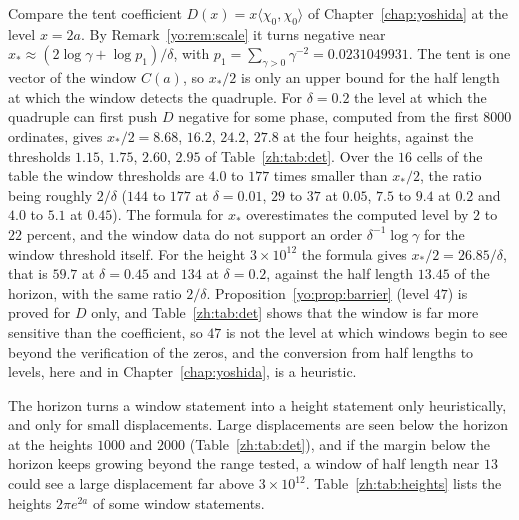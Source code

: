 Compare the tent coefficient $D(x)=x\langle\chi_0,\chi_0\rangle$ of Chapter~\ref{chap:yoshida} at the level $x=2a$. By Remark~\ref{yo:rem:scale} it turns negative near $x_*\approx(2\log\gamma+\log p_1)/\delta$, with $p_1=\sum_{\gamma>0}\gamma^{-2}=0.0231049931$. The tent is one vector of the window $C(a)$, so $x_*/2$ is only an upper bound for the half length at which the window detects the quadruple. For $\delta=0.2$ the level at which the quadruple can first push $D$ negative for some phase, computed from the first $8000$ ordinates, gives $x_*/2=8.68$, $16.2$, $24.2$, $27.8$ at the four heights, against the thresholds $1.15$, $1.75$, $2.60$, $2.95$ of Table~\ref{zh:tab:det}. Over the $16$ cells of the table the window thresholds are $4.0$ to $177$ times smaller than $x_*/2$, the ratio being roughly $2/\delta$ ($144$ to $177$ at $\delta=0.01$, $29$ to $37$ at $0.05$, $7.5$ to $9.4$ at $0.2$ and $4.0$ to $5.1$ at $0.45$). The formula for $x_*$ overestimates the computed level by $2$ to $22$ percent, and the window data do not support an order $\delta^{-1}\log\gamma$ for the window threshold itself. For the height $3\times10^{12}$ the formula gives $x_*/2=26.85/\delta$, that is $59.7$ at $\delta=0.45$ and $134$ at $\delta=0.2$, against the half length $13.45$ of the horizon, with the same ratio $2/\delta$. Proposition~\ref{yo:prop:barrier} (level $47$) is proved for $D$ only, and Table~\ref{zh:tab:det} shows that the window is far more sensitive than the coefficient, so $47$ is not the level at which windows begin to see beyond the verification of the zeros, and the conversion from half lengths to levels, here and in Chapter~\ref{chap:yoshida}, is a heuristic.

The horizon turns a window statement into a height statement only heuristically, and only for small displacements. Large displacements are seen below the horizon at the heights $1000$ and $2000$ (Table~\ref{zh:tab:det}), and if the margin below the horizon keeps growing beyond the range tested, a window of half length near $13$ could see a large displacement far above $3\times10^{12}$. Table~\ref{zh:tab:heights} lists the heights $2\pi e^{2a}$ of some window statements.

